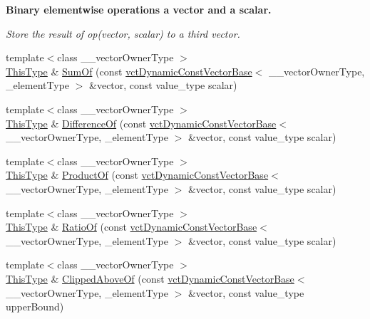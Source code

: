 \begin{Indent}{\bf Binary elementwise operations a vector and a scalar.}\par
{\em Store the result of op(vector, scalar) to a third vector. }\begin{DoxyCompactItemize}
\item 
{\footnotesize template$<$class \+\_\+\+\_\+vector\+Owner\+Type $>$ }\\\hyperlink{classvct_dynamic_const_vector_base_a39da273523717f678f54d3321ebca3dd}{This\+Type} \& \hyperlink{classvct_dynamic_vector_base_a2c0062999ae26dc98c2ba1bfdb98caa0}{Sum\+Of} (const \hyperlink{classvct_dynamic_const_vector_base}{vct\+Dynamic\+Const\+Vector\+Base}$<$ \+\_\+\+\_\+vector\+Owner\+Type, \+\_\+element\+Type $>$ \&vector, const value\+\_\+type scalar)
\item 
{\footnotesize template$<$class \+\_\+\+\_\+vector\+Owner\+Type $>$ }\\\hyperlink{classvct_dynamic_const_vector_base_a39da273523717f678f54d3321ebca3dd}{This\+Type} \& \hyperlink{classvct_dynamic_vector_base_a718ed377442500d229e086d991930b6b}{Difference\+Of} (const \hyperlink{classvct_dynamic_const_vector_base}{vct\+Dynamic\+Const\+Vector\+Base}$<$ \+\_\+\+\_\+vector\+Owner\+Type, \+\_\+element\+Type $>$ \&vector, const value\+\_\+type scalar)
\item 
{\footnotesize template$<$class \+\_\+\+\_\+vector\+Owner\+Type $>$ }\\\hyperlink{classvct_dynamic_const_vector_base_a39da273523717f678f54d3321ebca3dd}{This\+Type} \& \hyperlink{classvct_dynamic_vector_base_afabc21a02bc651668a08467c94d63edf}{Product\+Of} (const \hyperlink{classvct_dynamic_const_vector_base}{vct\+Dynamic\+Const\+Vector\+Base}$<$ \+\_\+\+\_\+vector\+Owner\+Type, \+\_\+element\+Type $>$ \&vector, const value\+\_\+type scalar)
\item 
{\footnotesize template$<$class \+\_\+\+\_\+vector\+Owner\+Type $>$ }\\\hyperlink{classvct_dynamic_const_vector_base_a39da273523717f678f54d3321ebca3dd}{This\+Type} \& \hyperlink{classvct_dynamic_vector_base_a65511640e701d17de999787dae10624a}{Ratio\+Of} (const \hyperlink{classvct_dynamic_const_vector_base}{vct\+Dynamic\+Const\+Vector\+Base}$<$ \+\_\+\+\_\+vector\+Owner\+Type, \+\_\+element\+Type $>$ \&vector, const value\+\_\+type scalar)
\item 
{\footnotesize template$<$class \+\_\+\+\_\+vector\+Owner\+Type $>$ }\\\hyperlink{classvct_dynamic_const_vector_base_a39da273523717f678f54d3321ebca3dd}{This\+Type} \& \hyperlink{classvct_dynamic_vector_base_aff114456352f054cfa33dcf55504d488}{Clipped\+Above\+Of} (const \hyperlink{classvct_dynamic_const_vector_base}{vct\+Dynamic\+Const\+Vector\+Base}$<$ \+\_\+\+\_\+vector\+Owner\+Type, \+\_\+element\+Type $>$ \&vector, const value\+\_\+type upper\+Bound)

\end{DoxyCompactItemize}
\end{Indent}

